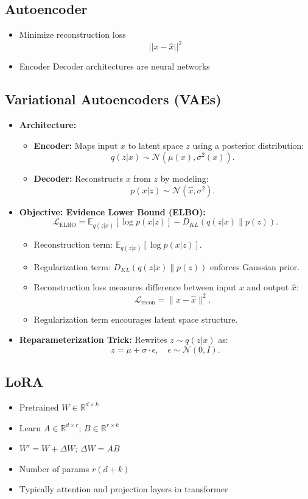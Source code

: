 \documentclass[12pt,a4paper]{article}
\begin{document}
\subsection{Autoencoder}
\begin{itemize}
    \item Minimize reconstruction loss \[||x-\hat x ||^2\]
    \item Encoder Decoder architectures are neural networks
\end{itemize}
\subsection{Variational Autoencoders (VAEs)}
\begin{itemize}
    \item \textbf{Architecture:}
    \begin{itemize}
        \item \textbf{Encoder:} Maps input $x$ to latent space $z$ using a posterior distribution:
        \[ q(z|x) \sim \mathcal{N}(\mu(x), \sigma^2(x)). \]
        \item \textbf{Decoder:} Reconstructs $x$ from $z$ by modeling:
        \[ p(x|z) \sim \mathcal{N}(\hat{x}, \sigma^2). \]
    \end{itemize}
    \item \textbf{Objective: Evidence Lower Bound (ELBO):}
    \[ \mathcal{L}_{\text{ELBO}} = \mathbb{E}_{q(z|x)}[\log p(x|z)] - D_{KL}(q(z|x) \| p(z)). \]
    \begin{itemize}
        \item Reconstruction term: $\mathbb{E}_{q(z|x)}[\log p(x|z)]$.
        \item Regularization term: $D_{KL}(q(z|x) \| p(z))$ enforces Gaussian prior.
        \item Reconstruction loss measures difference between input $x$ and output $\hat{x}$:
    \[ \mathcal{L}_{\text{recon}} = \|x - \hat{x}\|^2. \]
    \item Regularization term encourages latent space structure.
    \end{itemize}
    \item \textbf{Reparameterization Trick:} Rewrites $z \sim q(z|x)$ as:
    \[ z = \mu + \sigma \cdot \epsilon, \quad \epsilon \sim \mathcal{N}(0, I). \]
\end{itemize}
\subsection{LoRA}
\begin{itemize}
    \item Pretrained $W \in \mathbb{R}^{d \times k}$
    \item Learn $A \in \mathbb{R}^{d \times r}$; $B \in \mathbb{R}^{r \times k}$
    \item $W' = W + \Delta W$; $\Delta W  = AB$
    \item Number of params $r(d+k)$
    \item Typically attention and projection layers in transformer 
\end{itemize}
\end{document}
